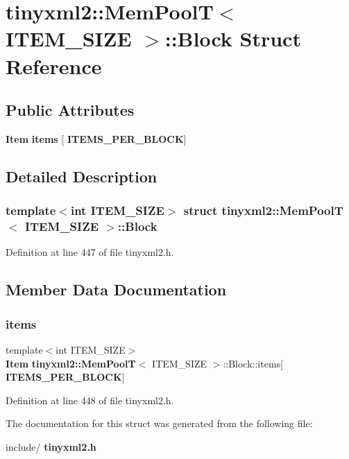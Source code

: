\section{tinyxml2\+::Mem\+PoolT$<$ I\+T\+E\+M\+\_\+\+S\+I\+ZE $>$\+::Block Struct Reference}
\label{structtinyxml2_1_1_mem_pool_t_1_1_block}
\subsection*{Public Attributes}
\begin{DoxyCompactItemize}
\item 
\textbf{ Item} \textbf{ items} [\textbf{ I\+T\+E\+M\+S\+\_\+\+P\+E\+R\+\_\+\+B\+L\+O\+CK}]
\end{DoxyCompactItemize}


\subsection{Detailed Description}
\subsubsection*{template$<$int I\+T\+E\+M\+\_\+\+S\+I\+ZE$>$\newline
struct tinyxml2\+::\+Mem\+Pool\+T$<$ I\+T\+E\+M\+\_\+\+S\+I\+Z\+E $>$\+::\+Block}



Definition at line 447 of file tinyxml2.\+h.



\subsection{Member Data Documentation}
\mbox{\label{structtinyxml2_1_1_mem_pool_t_1_1_block_a4f2589e877b60f26313e107433e550f7}} 
\subsubsection{items}
{\footnotesize\ttfamily template$<$int I\+T\+E\+M\+\_\+\+S\+I\+ZE$>$ \\
\textbf{ Item} \textbf{ tinyxml2\+::\+Mem\+PoolT}$<$ I\+T\+E\+M\+\_\+\+S\+I\+ZE $>$\+::Block\+::items[\textbf{ I\+T\+E\+M\+S\+\_\+\+P\+E\+R\+\_\+\+B\+L\+O\+CK}]}



Definition at line 448 of file tinyxml2.\+h.



The documentation for this struct was generated from the following file\+:\begin{DoxyCompactItemize}
\item 
include/\textbf{ tinyxml2.\+h}\end{DoxyCompactItemize}
